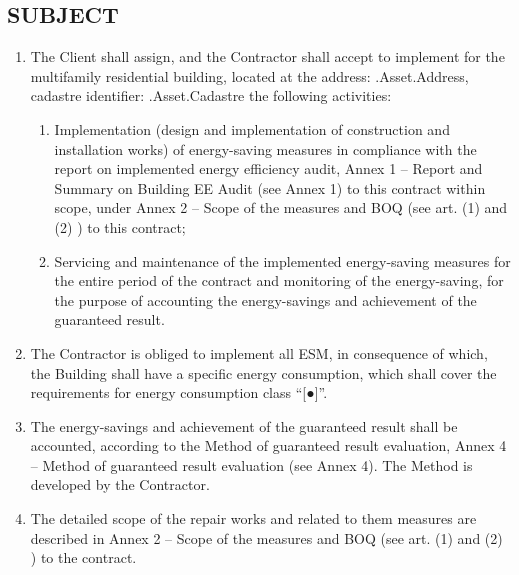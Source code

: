 \subsection{SUBJECT}
\begin{enumerate}
\item The Client shall assign, and the Contractor shall accept to
  implement for the multifamily residential building, located at the
  address: {{.Asset.Address}}, cadastre identifier:
  {{.Asset.Cadastre}} the following activities:
  \begin{enumerate}[label=\arabic*.]
  \item Implementation (design and implementation of construction and
    installation works) of energy-saving measures in compliance with
    the report on implemented energy efficiency audit, Annex 1 {–}
    Report and Summary on Building EE Audit (see Annex 1) to this
    contract within scope, under Annex 2 {–} Scope of the measures and
    BOQ (see art. (1) and (2) ) to this contract;
  \item Servicing and maintenance of the implemented energy-saving
    measures for the entire period of the contract and monitoring of
    the energy-saving, for the purpose of accounting the
    energy-savings and achievement of the guaranteed result.
  \end{enumerate}
\item The Contractor is obliged to implement all ESM, in consequence
  of which, the Building shall have a specific energy consumption,
  which shall cover the requirements for energy consumption class
  “[●]”.
\item The energy-savings and achievement of the guaranteed result
  shall be accounted, according to the Method of guaranteed result
  evaluation, Annex 4 {–} Method of guaranteed result evaluation (see
  Annex 4). The Method is developed by the Contractor.
\item The detailed scope of the repair works and related to them
  measures are described in Annex 2 {–} Scope of the measures and BOQ
  (see art. (1) and (2) ) to the contract.
\end{enumerate}

